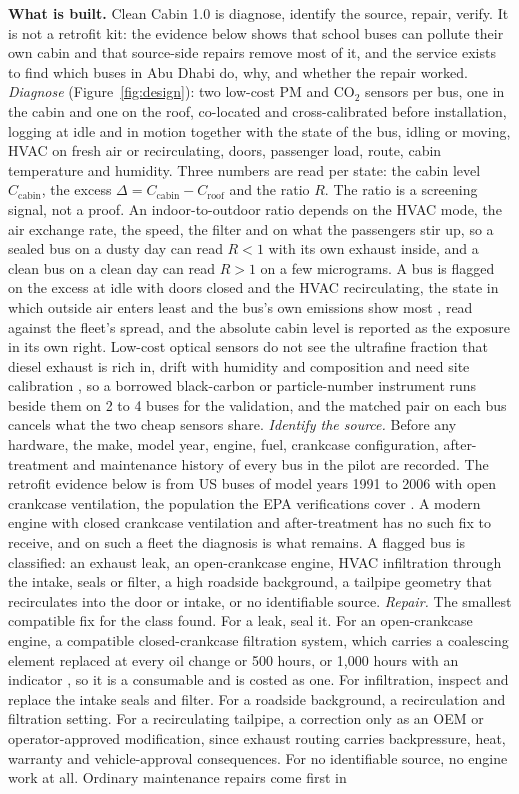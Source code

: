 \documentclass[10pt,a4paper]{article}
\begin{document}
\textbf{What is built.} Clean Cabin 1.0 is diagnose, identify the source, repair, verify. It is not a retrofit kit: the evidence below shows that school buses can pollute their own cabin and that source-side repairs remove most of it, and the service exists to find which buses in Abu Dhabi do, why, and whether the repair worked. \emph{Diagnose} (Figure~\ref{fig:design}): two low-cost PM and CO\(_2\) sensors per bus, one in the cabin and one on the roof, co-located and cross-calibrated before installation, logging at idle and in motion together with the state of the bus, idling or moving, HVAC on fresh air or recirculating, doors, passenger load, route, cabin temperature and humidity. Three numbers are read per state: the cabin level \(C_{\mathrm{cabin}}\), the excess \(\Delta=C_{\mathrm{cabin}}-C_{\mathrm{roof}}\) and the ratio \(R\). The ratio is a screening signal, not a proof. An indoor-to-outdoor ratio depends on the HVAC mode, the air exchange rate, the speed, the filter and on what the passengers stir up, so a sealed bus on a dusty day can read \(R<1\) with its own exhaust inside, and a clean bus on a clean day can read \(R>1\) on a few micrograms. A bus is flagged on the excess at idle with doors closed and the HVAC recirculating, the state in which outside air enters least and the bus's own emissions show most \citep{Behrentz2005}, read against the fleet's spread, and the absolute cabin level is reported as the exposure in its own right. Low-cost optical sensors do not see the ultrafine fraction that diesel exhaust is rich in, drift with humidity and composition and need site calibration \citep{Zheng2018}, so a borrowed black-carbon or particle-number instrument runs beside them on 2 to 4 buses for the validation, and the matched pair on each bus cancels what the two cheap sensors share. \emph{Identify the source.} Before any hardware, the make, model year, engine, fuel, crankcase configuration, after-treatment and maintenance history of every bus in the pilot are recorded. The retrofit evidence below is from US buses of model years 1991 to 2006 with open crankcase ventilation, the population the EPA verifications cover \citep{EPASpiracle}. A modern engine with closed crankcase ventilation and after-treatment has no such fix to receive, and on such a fleet the diagnosis is what remains. A flagged bus is classified: an exhaust leak, an open-crankcase engine, HVAC infiltration through the intake, seals or filter, a high roadside background, a tailpipe geometry that recirculates into the door or intake, or no identifiable source. \emph{Repair.} The smallest compatible fix for the class found. For a leak, seal it. For an open-crankcase engine, a compatible closed-crankcase filtration system, which carries a coalescing element replaced at every oil change or 500 hours, or 1,000 hours with an indicator \citep{EPASpiracle}, so it is a consumable and is costed as one. For infiltration, inspect and replace the intake seals and filter. For a roadside background, a recirculation and filtration setting. For a recirculating tailpipe, a correction only as an OEM or operator-approved modification, since exhaust routing carries backpressure, heat, warranty and vehicle-approval consequences. For no identifiable source, no engine work at all. Ordinary maintenance repairs come first in 
\end{document}
